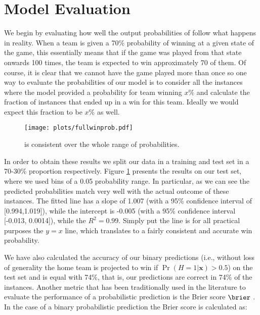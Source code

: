 \section{Model Evaluation}
\label{sec:evaluation}

We begin by evaluating how well the output probabilities of {\method} follow what happens in reality.  
When a team is given a 70\% probability of winning at a given state of the game, this essentially means that if the game was played from that state onwards 100 times, the team is expected to win approximately 70 of them.  
Of course, it is clear that we cannot have the game played more than once so one way to evaluate the probabilities of our model is to consider all the instances where the model provided a probability for team winning $x\%$ and calculate the fraction of instances that ended up in a win for this team.  
Ideally we would expect this fraction to be $x\%$ as well. 

\begin{figure}[t]
\begin{center}
\texttt{[image: plots/fullwinprob.pdf]}%
 \caption{{\method} is consistent over the whole range of probabilities.}
 \label{fig:fullwp}
\end{center}
\end{figure}

In order to obtain these results we split our data in a training and test set in a 70-30\% proportion respectively.    
Figure \ref{fig:fullwp} presents the results on our test set, where we used bins of a 0.05 probability range. 
In particular, as we can see the predicted probabilities match very well with the actual outcome of these instances.  
The fitted line has a slope of 1.007 (with a 95\% confidence interval of [0.994,1.019]), while the intercept is -0.005 (with a 95\% confidence interval [-0.013, 0.0014]), while the $R^2 = 0.99$.  
Simply put the line is for all practical purposes the $y=x$ line, which translates to a fairly consistent and accurate win probability. 

We have also calculated the accuracy of our binary predictions (i.e., without loss of generality the home team is projected to win if $\Pr(H=1| \mathbf{x})>0.5$) on the test set and is equal with 74\%, that is, our predictions are correct in 74\% of the instances.  
Another metric that has been traditionally used in the literature to evaluate the performance of a probabilistic prediction is the Brier score $\brier$ \cite{brier1950verification}.  
In the case of a binary probabilistic prediction the Brier score is calculated as: 

